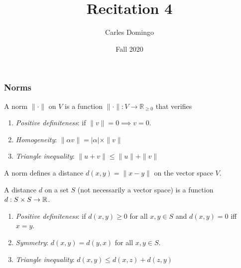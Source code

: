 \documentclass{beamer}
\title{Recitation 4}
\author{Carles Domingo}
\date{Fall 2020}
\begin{document}
\frame{\titlepage} 

\setcounter{showProgressBar}{0}
\setcounter{showSlideNumbers}{1}

\begin{frame}[t]
\frametitle{Norms}
\begin{definition}[Norm]
	A norm $\| \cdot \|$ on $V$ is a function $\| \cdot \| : V \rightarrow \mathbb{R}_{\geq 0}$ that verifies
	\begin{enumerate}
		\item \emph{Positive definiteness}: if $\|v\| = 0 \implies v=0$. \hfill
		\item \emph{Homogeneity}: $\| \alpha v \| = |\alpha|\times \| v\|$ \hfill 
		\item \emph{Triangle inequality}: $\|u + v\| \leq \|u\| + \|v\|$ \hfill 
	\end{enumerate}
\end{definition}
A norm defines a distance $d(x,y) = \|x-y\|$ on the vector space $V$.
\begin{definition}[Distance]
	A distance $d$ on a set $S$ (not necessarily a vector space) is a function $d : S \times S \rightarrow \mathbb{R}$.
	\begin{enumerate}
		\item \emph{Positive definiteness}: if $d(x,y) \geq 0$ for all $x,y \in S$ and $d(x,y) = 0$ iff $x = y$. \hfill
		\item \emph{Symmetry}: $d(x,y) = d(y,x)$ for all $x, y \in S$. \hfill 
		\item \emph{Triangle inequality}: $d(x,y) \leq d(x,z) + d(z,y)$ \hfill 
	\end{enumerate}
\end{definition}
\end{frame}
\end{document}
